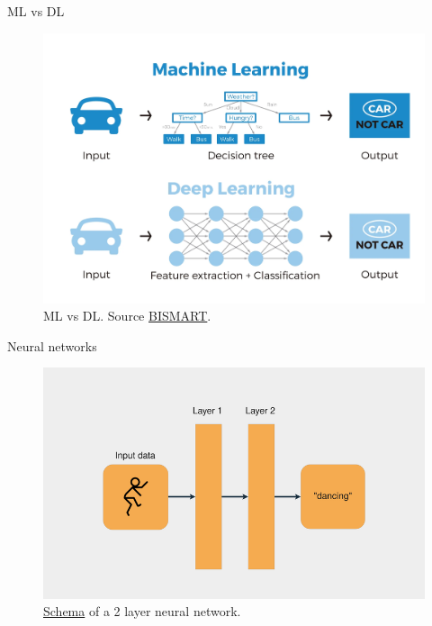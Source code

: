 \documentclass{beamer}
\begin{document}
\begin{frame}{ML vs DL}
    \begin{figure}
        \includegraphics[width=0.8\linewidth]{MLvsDL}
        \caption{ML vs DL. Source \href{https://blog.bismart.com/diferencia-machine-learning-deep-learning}{BISMART}.}
        \label{Fig:MLvsDL}
    \end{figure}
\end{frame}

\begin{frame}{Neural networks}
    \begin{figure}
        \includegraphics[width=0.9\linewidth]{2layerNN}
        \caption{ \href{https://realpython.com/python-ai-neural-network/}{Schema} of a 2 layer neural network.}
        \label{Fig:FeatureEngineering}
    \end{figure}
\end{frame}
\end{document}
